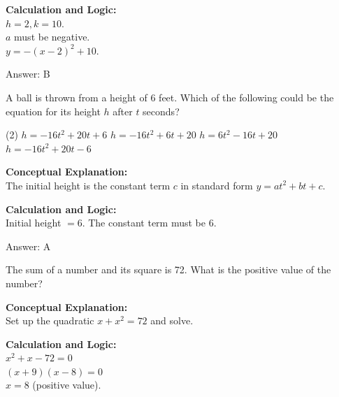 \documentclass[11pt,paper=a4,answers]{exam}
\begin{document}
\begin{questions}
\begin{solution}
\vspace{20pt}

\textbf{Calculation and Logic:} \\
$h = 2, k = 10$. \\
$a$ must be negative. \\
$y = -(x-2)^2 + 10$.

\vspace{25pt}

Answer: \colorbox{yellow!100}{B}
\end{solution}

\vspace{40pt}

\question
A ball is thrown from a height of 6 feet. Which of the following could be the equation for its height $h$ after $t$ seconds?
\begin{tasks}(2)
    \task $h = -16t^2 + 20t + 6$
    \task $h = -16t^2 + 6t + 20$
    \task $h = 6t^2 - 16t + 20$
    \task $h = -16t^2 + 20t - 6$
\end{tasks}

\begin{solution}
\textbf{Conceptual Explanation:} \\
The initial height is the constant term $c$ in standard form $y = at^2+bt+c$.

\vspace{20pt}

\textbf{Calculation and Logic:} \\
Initial height $= 6$. The constant term must be 6.

\vspace{25pt}

Answer: \colorbox{yellow!100}{A}
\end{solution}

\vspace{40pt}

\question
The sum of a number and its square is 72. What is the positive value of the number?

\begin{solution}
\textbf{Conceptual Explanation:} \\
Set up the quadratic $x + x^2 = 72$ and solve.

\vspace{20pt}

\textbf{Calculation and Logic:} \\
$x^2 + x - 72 = 0$ \\
$(x+9)(x-8) = 0$ \\
$x = 8$ (positive value).


\end{solution}
\end{questions}
\end{document}
